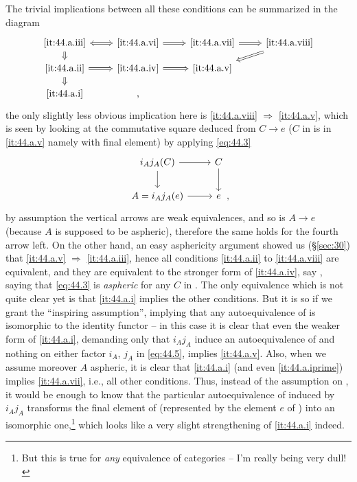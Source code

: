 The trivial implications between all these conditions can be
summarized in the diagram
\[\begin{tikzcd}[baseline=(O.base),math mode=false,%
  row sep=small,arrows=Rightarrow]
  \ref{it:44.a.iii} \ar[r,Leftrightarrow]\ar[d] & \ref{it:44.a.vi} \ar[r] &
  \ref{it:44.a.vii} \ar[r] & \ref{it:44.a.viii} \ar[dl] \\
  \ref{it:44.a.ii} \ar[r]\ar[d] & \ref{it:44.a.iv} \ar[r] &
  \ref{it:44.a.v} & \\
  |[alias=O]| \ref{it:44.a.i} & , & &
\end{tikzcd}\]
the only slightly less obvious implication here is \ref{it:44.a.viii}
$\Rightarrow$ \ref{it:44.a.v}, which is seen by looking at the
commutative square deduced from $C\to e$ ($C$ in \Cat{} is in
\ref{it:44.a.v} namely with final element) by applying
\eqref{eq:44.3}
\[\begin{tikzcd}[baseline=(O.base)]
  i_Aj_A(C)\ar[d]\ar[r] & C\ar[d] \\
  A=i_Aj_A(e)\ar[r] & |[alias=O]| e
\end{tikzcd},\]
by assumption the vertical arrows are weak equivalences, and so is
$A\to e$ (because $A$ is supposed to be aspheric), therefore the same
holds for the fourth arrow left. On the other hand, an easy
asphericity argument showed us (\S \ref{sec:30}) that \ref{it:44.a.v} $\Rightarrow$
\ref{it:44.a.iii}, hence all conditions \ref{it:44.a.ii} to
\ref{it:44.a.viii} are equivalent, and they are equivalent to the
stronger form of \ref{it:44.a.iv}, say
, saying that \eqref{eq:44.3} is
\emph{aspheric} for any $C$ in \Cat. The only equivalence which is not
quite clear yet is that \ref{it:44.a.i} implies the other
conditions. But it is so if we grant the ``inspiring
assumption'', implying that any autoequivalence of \Hot{} is
isomorphic to the identity functor -- in this case it is clear that
even the weaker form  of \ref{it:44.a.i},
demanding only that $i_Aj_A$ induce an autoequivalence of \Hot{} and
nothing on either factor $i_A$, $j_A$ in \eqref{eq:44.5}, implies
\ref{it:44.a.v}. Also, when we assume moreover $A$ aspheric, it is
clear that \ref{it:44.a.i} (and even \ref{it:44.a.iprime}) implies
\ref{it:44.a.vii}, i.e., all other conditions. Thus, instead of the
assumption on \Hot, it would be enough to know that the particular
autoequivalence of \Hot{} induced by $i_Aj_A$ transforms the final
element of \Hot{} (represented by the element $e$ of \Cat) into an
isomorphic one,\footnote{ But this is true for \emph{any}
  equivalence of categories -- I'm really being very dull!} which
looks like a very slight strengthening of \ref{it:44.a.i} indeed.

